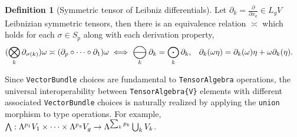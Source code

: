 \documentclass[]{article}
\theoremstyle{definition}
\newtheorem{definition}{Definition}
\theoremstyle{remark}
\DeclareMathOperator*{\bigominus}{\scalerel*{\ominus}{\bigodot}}
\begin{document}
\begin{definition}[Symmetric tensor of Leibniz differentials]
	Let $\partial_k = \frac\partial{\partial x_k}\in L_gV\,$ Leibnizian symmetric tensors, then there is an equivalence relation $\asymp$ which holds for each $\sigma\in S_p$ along with each derivation property,
	\begin{align*}
		(\bigotimes_k \partial_{\sigma(k)})\omega &\asymp (\partial_p \circ \dots\circ  \partial_1)\omega \iff \bigominus_k\partial_k = \bigodot_k\partial_k, & \partial_k(\omega\eta) &= \partial_k(\omega)\eta + \omega\partial_k(\eta).
	\end{align*}
\end{definition}	




Since \verb`VectorBundle` choices are fundamental to \verb`TensorAlgebra` operations, the universal interoperability between \verb`TensorAlgebra{V}` elements with different associated \verb`VectorBundle` choices is naturally realized by applying the \verb`union` morphism to type operations.
For example, $\bigwedge :\Lambda^{p_1}V_1\times\dots\times\Lambda^{p_g}V_g \rightarrow \Lambda^{\sum_kp_k}\bigcup_k V_k$. 
\end{document}
